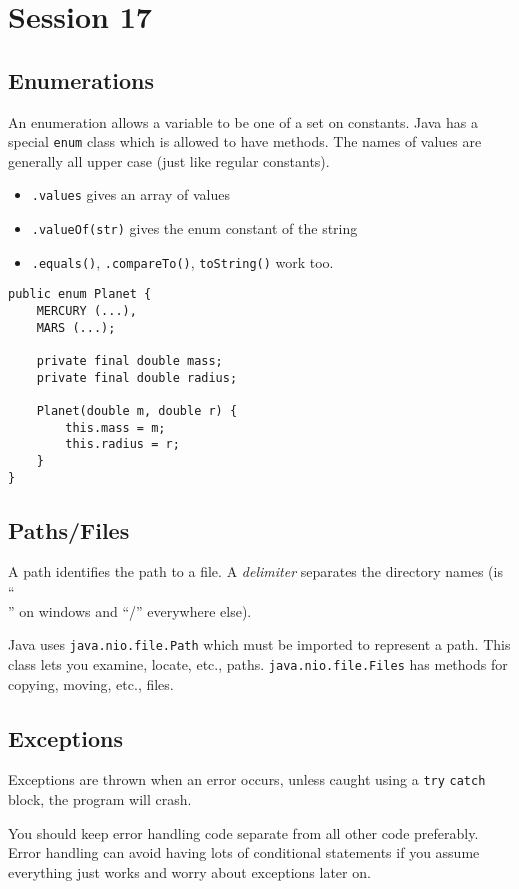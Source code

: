 \section{Session 17}\label{sec:session_17}

\subsection{Enumerations}\label{sub:enumerations}

An enumeration allows a variable to be one of a set on constants.
Java has a special \texttt{enum} class which is allowed to have methods.
The names of values are generally all upper case (just like regular constants).

\begin{itemize}
	\item \texttt{.values} gives an array of values
	\item \texttt{.valueOf(str)} gives the enum constant of the string
	\item \texttt{.equals()}, \texttt{.compareTo()}, \texttt{toString()} work too.
\end{itemize}

\begin{verbatim}
public enum Planet {
    MERCURY (...),
    MARS (...);

    private final double mass;
    private final double radius;

    Planet(double m, double r) {
        this.mass = m;
        this.radius = r;
    }
}
\end{verbatim}

\subsection{Paths/Files}\label{sub:paths_files}

A path identifies the path to a file.
A \emph{delimiter} separates the directory names (is ``\\'' on windows and ``/'' everywhere else).

Java uses \texttt{java.nio.file.Path} which must be imported to represent a path.
This class lets you examine, locate, etc., paths.
\texttt{java.nio.file.Files} has methods for copying, moving, etc., files.

\subsection{Exceptions}\label{sub:exceptions}

Exceptions are thrown when an error occurs, unless caught using a \texttt{try} \texttt{catch} block, the program will crash.

You should keep error handling code separate from all other code preferably.
Error handling can avoid having lots of conditional statements if you assume everything just works and worry about exceptions later on.
